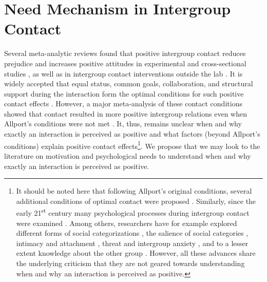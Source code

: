 \documentclass[man, 12pt, a4paper, mask]{apa7}
\theoremstyle{break}
\theoremstyle{plain}
\begin{document}
\section{Need Mechanism in Intergroup Contact}
Several meta-analytic reviews found that positive intergroup contact reduces prejudice and increases positive attitudes in experimental and cross-sectional studies \citep[][]{Tropp2005, Pettigrew2006, Davies2011}, as well as in intergroup contact interventions outside the lab \citep[][]{Beelmann2014, Lemmer2015}. It is widely accepted that equal status, common goals, collaboration, and structural support during the interaction form the optimal conditions for such positive contact effects \citep[Allport's Optimal Contact conditions;][]{Allport1954b, Pettigrew1969}. However, a major meta-analysis of these contact conditions showed that contact resulted in more positive intergroup relations even when Allport's conditions were not met \citep[][]{Pettigrew2006}. It, thus, remains unclear when and why exactly an interaction is perceived as positive and what factors (beyond Allport's conditions) explain positive contact effects\footnote{It should be noted here that following Allport's original conditions, several additional conditions of optimal contact were proposed \citep[for a critical discussion see][]{Pettigrew1986}. Similarly, since the early 21\textsuperscript{st} century many psychological processes during intergroup contact were examined \citep[e.g. see,][]{Paolini2021}. Among others, researchers have for example explored different forms of social categorizations \citep[][]{Pettigrew1998}, the salience of social categories \citep[][]{Brown2005}, intimacy \citep[e.g.,][]{Marinucci2021} and attachment \citep[e.g.,][]{Tropp2021}, threat and intergroup anxiety \citep[e.g.,][]{Stephan2008, Paolini2004}, and to a lesser extent knowledge about the other group \citep[][]{Pettigrew2008c}. However, all these advances share the underlying criticism that they are not geared towards understanding when and why an interaction is perceived as positive.}. We propose that we may look to the literature on motivation and psychological needs to understand when and why exactly an interaction is perceived as positive.
\end{document}
